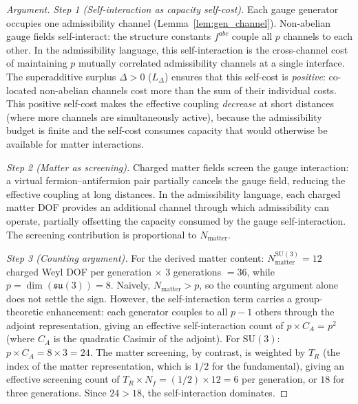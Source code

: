 \documentclass[11pt]{article}
\theoremstyle{definition}
\newcommand{\SU}{\mathrm{SU}}
\begin{document}
\begin{proof}[Argument]
\textit{Step 1 (Self-interaction as capacity self-cost).}\quad
Each gauge generator occupies one admissibility channel
(Lemma~\ref{lem:gen_channel}).  Non-abelian gauge fields
self-interact: the structure constants $f^{abc}$ couple all $p$
channels to each other.  In the admissibility language, this
self-interaction is the cross-channel cost of maintaining $p$
mutually correlated admissibility channels at a single interface.  The
superadditive surplus $\Delta > 0$ ($L_\Delta$) ensures that this
self-cost is \emph{positive}: co-located non-abelian channels cost
more than the sum of their individual costs.  This positive
self-cost makes the effective coupling \emph{decrease} at short
distances (where more channels are simultaneously active), because
the admissibility budget is finite and the self-cost consumes capacity
that would otherwise be available for matter interactions.

\textit{Step 2 (Matter as screening).}\quad
Charged matter fields screen the gauge interaction: a virtual
fermion--antifermion pair partially cancels the gauge field,
reducing the effective coupling at long distances.  In the
admissibility language, each charged matter DOF provides an
additional channel through which admissibility can operate, partially
offsetting the capacity consumed by the gauge self-interaction.  The
screening contribution is proportional to $N_{\mathrm{matter}}$.

\textit{Step 3 (Counting argument).}\quad
For the derived matter content:
$N_{\mathrm{matter}}^{\SU(3)} = 12$ charged Weyl DOF per generation
$\times$ 3 generations $= 36$, while $p = \dim(\mathfrak{su}(3)) = 8$.
Naively, $N_{\mathrm{matter}} > p$, so the counting argument alone
does not settle the sign.  However, the self-interaction term carries
a group-theoretic enhancement: each generator couples to all $p - 1$
others through the adjoint representation, giving an effective
self-interaction count of $p \times C_A = p^2$ (where $C_A$ is the
quadratic Casimir of the adjoint).  For $\SU(3)$:
$p \times C_A = 8 \times 3 = 24$.  The matter screening, by contrast,
is weighted by $T_R$ (the index of the matter representation, which is
$1/2$ for the fundamental), giving an effective screening count of
$T_R \times N_f = (1/2) \times 12 = 6$ per generation, or $18$ for
three generations.  Since $24 > 18$, the self-interaction dominates.
\end{proof}
\end{document}
